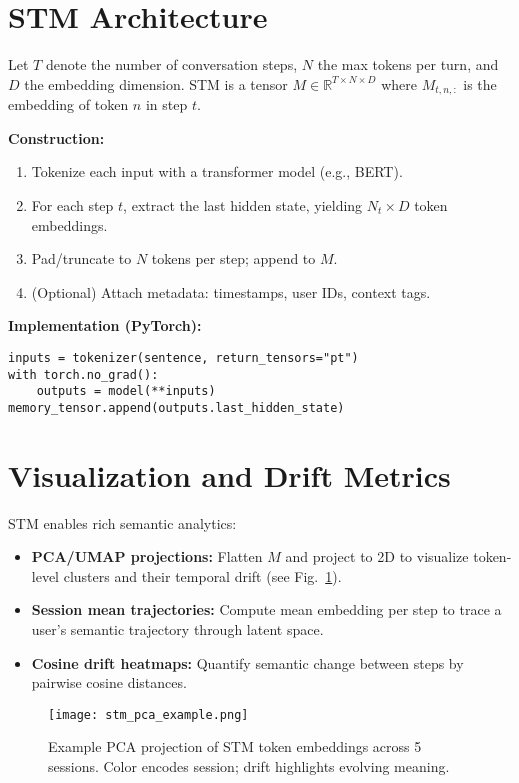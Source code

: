 \documentclass[11pt]{article}
\begin{document}
\section{STM Architecture}
Let $T$ denote the number of conversation steps, $N$ the max tokens per turn, and $D$ the embedding dimension. STM is a tensor $M \in \mathbb{R}^{T \times N \times D}$ where $M_{t, n, :}$ is the embedding of token $n$ in step $t$.

\vspace{0.5em}
\textbf{Construction:}
\begin{enumerate}[leftmargin=2em]
    \item Tokenize each input with a transformer model (e.g., BERT).
    \item For each step $t$, extract the last hidden state, yielding $N_t \times D$ token embeddings.
    \item Pad/truncate to $N$ tokens per step; append to $M$.
    \item (Optional) Attach metadata: timestamps, user IDs, context tags.
\end{enumerate}

\vspace{0.5em}
\textbf{Implementation (PyTorch):}
\begin{verbatim}
inputs = tokenizer(sentence, return_tensors="pt")
with torch.no_grad():
    outputs = model(**inputs)
memory_tensor.append(outputs.last_hidden_state)
\end{verbatim}

\section{Visualization and Drift Metrics}
STM enables rich semantic analytics:
\begin{itemize}[leftmargin=2em]
    \item \textbf{PCA/UMAP projections:} Flatten $M$ and project to 2D to visualize token-level clusters and their temporal drift (see Fig.~\ref{fig:pca}).
    \item \textbf{Session mean trajectories:} Compute mean embedding per step to trace a user's semantic trajectory through latent space.
    \item \textbf{Cosine drift heatmaps:} Quantify semantic change between steps by pairwise cosine distances.
\end{itemize}

\begin{figure}[h]
    \centering
    \texttt{[image: stm\_pca\_example.png]}
    \caption{Example PCA projection of STM token embeddings across 5 sessions. Color encodes session; drift highlights evolving meaning.}
    \label{fig:pca}
\end{figure}
\end{document}
